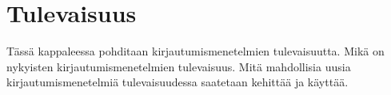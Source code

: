 \chapter{Tulevaisuus\label{tulevaisuus}}

Tässä kappaleessa pohditaan kirjautumismenetelmien tulevaisuutta. Mikä on nykyisten kirjautumismenetelmien tulevaisuus. Mitä mahdollisia uusia kirjautumismenetelmiä tulevaisuudessa saatetaan kehittää ja käyttää.